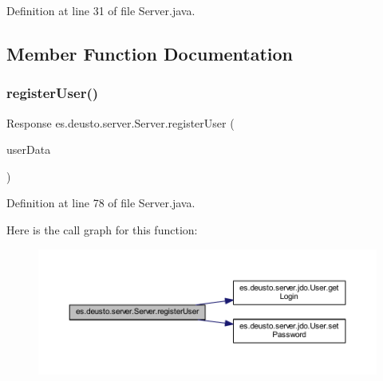 Definition at line 31 of file Server.\+java.



\subsection{Member Function Documentation}
\mbox{\label{classes_1_1deusto_1_1server_1_1_server_a12f56d7a970c3c41fefe8ed2db835c0a}} 
\subsubsection{\texorpdfstring{registerUser()}{registerUser()}}
{\footnotesize\ttfamily Response es.\+deusto.\+server.\+Server.\+register\+User (\begin{DoxyParamCaption}\item[{\mbox{\hyperlink{classes_1_1deusto_1_1serialization_1_1_user_data}{User\+Data}}}]{user\+Data }\end{DoxyParamCaption})}



Definition at line 78 of file Server.\+java.

Here is the call graph for this function\+:
\nopagebreak
\begin{figure}[H]
\begin{center}
\leavevmode
\includegraphics[width=350pt]{classes_1_1deusto_1_1server_1_1_server_a12f56d7a970c3c41fefe8ed2db835c0a_cgraph}
\end{center}
\end{figure}
\mbox{\label{classes_1_1deusto_1_1server_1_1_server_ad12ddecc48082c7a61e5c9595977e2b5}} 
